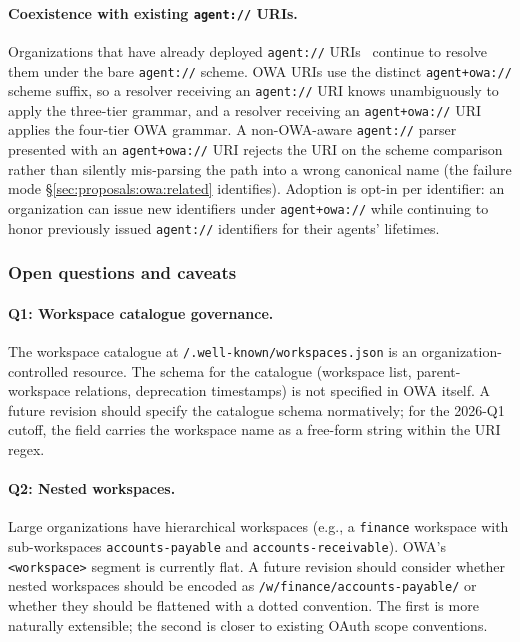 \paragraph{Coexistence with existing \texttt{agent://} URIs.}
Organizations that have already deployed
\texttt{agent://} URIs~\cite{agent_uri_scheme} continue to
resolve them under the bare \texttt{agent://} scheme.
OWA URIs use the distinct \texttt{agent+owa://} scheme
suffix, so a resolver receiving an \texttt{agent://} URI
knows unambiguously to apply the three-tier grammar, and a
resolver receiving an \texttt{agent+owa://} URI applies
the four-tier OWA grammar. A non-OWA-aware
\texttt{agent://} parser presented with an
\texttt{agent+owa://} URI rejects the URI on the scheme
comparison rather than silently mis-parsing the path into
a wrong canonical name (the failure mode
\S\ref{sec:proposals:owa:related} identifies). Adoption is
opt-in per identifier: an organization can issue new
identifiers under \texttt{agent+owa://} while continuing
to honor previously issued \texttt{agent://} identifiers
for their agents' lifetimes.

\subsubsection{Open questions and caveats}
\label{sec:proposals:owa:open}

\paragraph{Q1: Workspace catalogue governance.}
The workspace catalogue at
\texttt{/.well-known/workspaces.json} is an
organization-controlled resource. The schema for the
catalogue (workspace list, parent-workspace relations,
deprecation timestamps) is not specified in OWA itself.
A future revision should specify the catalogue schema
normatively; for the 2026-Q1 cutoff, the field carries
the workspace name as a free-form string within the
URI regex.

\paragraph{Q2: Nested workspaces.}
Large organizations have hierarchical workspaces
(e.g., a \texttt{finance} workspace with sub-workspaces
\texttt{accounts-payable} and \texttt{accounts-receivable}).
OWA's \texttt{<workspace>} segment is currently flat. A
future revision should consider whether nested
workspaces should be encoded as
\texttt{/w/finance/accounts-payable/} or whether they
should be flattened with a dotted convention. The first
is more naturally extensible; the second is closer to
existing OAuth scope conventions.

